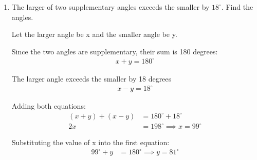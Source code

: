 \begin{enumerate}[label=\thesubsection.\arabic*, ref=\thesubsection.\theenumi]
	\solution
	The maximum frequency is 50, which lies in the class interval 35--40. Therefore, the modal class is 35--40[cite: 5].
	
	From the modal class:
	\begin{align*}
		\text{Lower limit, } l = 35 \\
		\text{Class size, } h = 40 - 35 = 5 \\
		\text{Frequency of modal class, } f_1 = 50 \\
		\text{Frequency of class preceding modal class, } f_0 = 34 \\
		\text{Frequency of class succeeding modal class, } f_2 = 42
	\end{align*}
	
	The formula for the mode of grouped data is:
	\begin{align*}
		\text{Mode} &= l + \left(\frac{f_1 - f_0}{2f_1 - f_0 - f_2}\right) \times h
	\end{align*}
	
	Substituting the values:
	\begin{align*}
		\text{Mode} &= 35 + \left(\frac{50 - 34}{2(50) - 34 - 42}\right) \times 5 \\
		&= 35 + \left(\frac{16}{24}\right) \times 5 \\
		&= 35 + \frac{10}{3} \\
		&= 38.33
	\end{align*}

	
	\item The larger of two supplementary angles exceeds the smaller by
	$18^\circ$. Find the angles.
	
	\solution
	Let the larger angle be x and the smaller angle be y.
	
	Since the two angles are supplementary, their sum is 180 degrees:
	\begin{align*}
		x + y = 180^\circ
	\end{align*}
	
	The larger angle exceeds the smaller by 18 degrees
	\begin{align*}
		x - y = 18^\circ
	\end{align*}
	
	Adding both equations:
	\begin{align*}
		(x + y) + (x - y) &= 180^\circ + 18^\circ \\
		2x &= 198^\circ \implies x = 99^\circ
	\end{align*}
	
	Substituting the value of x into the first equation:
	\begin{align*}
		99^\circ + y &= 180^\circ \implies y = 81^\circ
	\end{align*}
	

\end{enumerate}
